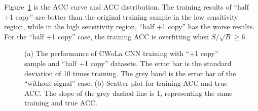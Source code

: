 \documentclass[12pt]{article}
\begin{document}
            Figure~\ref{fig:cwola_cnn_training_performance_half_copy_1} is the ACC curve and ACC distribution. The training results of ``half +1 copy'' are better than the original training sample in the low sensitivity region, while in the high sensitivity region, ``half +1 copy'' has the worse results. For the ``half +1 copy'' case, the training ACC is overfitting when $S / \sqrt{B} \ge 6$.
            \begin{figure}[htpb]
                \centering
                \caption{(a) The performance of CWoLa CNN training with ``+1 copy'' sample and ``half +1 copy'' datasets. The error bar is the standard deviation of 10 times training. The grey band is the error bar of the ``without signal'' case. (b) Scatter plot for training ACC and true ACC. The slope of the grey dashed line is 1, representing the same training and true ACC.}
                \label{fig:cwola_cnn_training_performance_half_copy_1}
            \end{figure}
\end{document}
